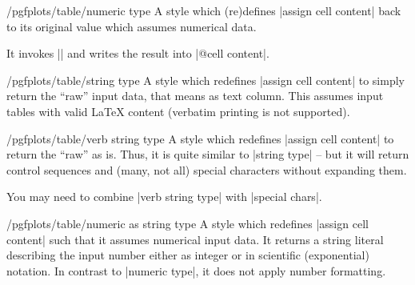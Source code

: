 \documentclass[a4paper]{ltxdoc}
\begin{document}
\begin{stylekey}{/pgfplots/table/numeric type}
    A style which (re)defines |assign cell content| back to its original value
    which assumes numerical data.

    It invokes |\pgfmathprintnumberto| and writes the result into
    |@cell content|.
\end{stylekey}

\begin{stylekey}{/pgfplots/table/string type}
    A style which redefines |assign cell content| to simply return the ``raw''
    input data, that means as text column. This assumes input tables with valid
    \LaTeX{} content (verbatim printing is not supported).
\end{stylekey}

\begin{stylekey}{/pgfplots/table/verb string type}
    A style which redefines |assign cell content| to return the ``raw'' as is.
    Thus, it is quite similar to |string type| -- but it will return control
    sequences and (many, not all) special characters without expanding them.

    You may need to combine |verb string type| with |special chars|.
\end{stylekey}

\begin{stylekey}{/pgfplots/table/numeric as string type}
    A style which redefines |assign cell content| such that it assumes
    numerical input data. It returns a string literal describing the input
    number either as integer or in scientific (exponential) notation. In
    contrast to |numeric type|, it does not apply number formatting.
\end{stylekey}
\end{document}
